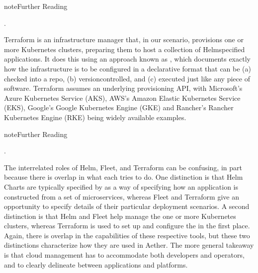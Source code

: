 \documentclass[a4paper,11pt,english]{sphinxmanual}
\begin{document}
\label{\detokenize{cloud:reading-fleet}}
\begin{sphinxadmonition}{note}{Further Reading}

\sphinxAtStartPar
{}.
\end{sphinxadmonition}

\sphinxAtStartPar
Terraform is an infrastructure manager that, in our scenario,
provisions one or more Kubernetes clusters, preparing them to host a
collection of Helm\sphinxhyphen{}specified applications. It does this using an
approach known as , which documents exactly
how the infrastructure is to be configured in a declarative format
that can be (a) checked into a repo, (b) version\sphinxhyphen{}controlled, and (c)
executed just like any piece of software. Terraform assumes an
underlying provisioning API, with Microsoft’s Azure Kubernetes Service
(AKS), AWS’s Amazon Elastic Kubernetes Service (EKS), Google’s Google
Kubernetes Engine (GKE) and Rancher’s Rancher Kubernetes Engine (RKE)
being widely available examples.

\label{\detokenize{cloud:reading-terraform}}
\begin{sphinxadmonition}{note}{Further Reading}

\sphinxAtStartPar
{}.
\end{sphinxadmonition}

\sphinxAtStartPar
The inter\sphinxhyphen{}related roles of Helm, Fleet, and Terraform can be
confusing, in part because there is overlap in what each tries to do.
One distinction is that Helm Charts are typically specified by
 as a way of specifying how an application is constructed
from a set of microservices, whereas Fleet and Terraform give
 an opportunity to specify details of their particular
deployment scenarios. A second distinction is that Helm and Fleet help
manage the  one or more Kubernetes clusters,
whereas Terraform is used to set up and configure the  in the first place. Again, there is overlap in
the capabilities of these respective tools, but these two distinctions
characterize how they are used in Aether. The more general takeaway is
that cloud management has to accommodate both developers and
operators, and to clearly delineate between applications and
platforms.
\end{document}

